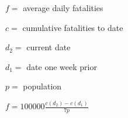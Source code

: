 \documentclass[12pt,letterpaper,draft]{article}
\title{}
\begin{document}
$f=$ average daily fatalities

$c=$ cumulative fatalities to date

$d_2=$ current date

$d_1=$ date one week prior

$p=$ population

$f=100000\frac{c(d_2)-c(d_1)}{7p}$
\end{document}
